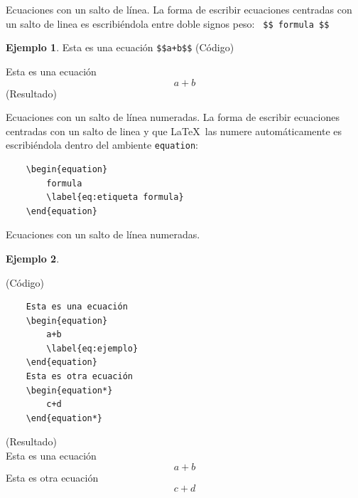 \documentclass[dvipsnames,xcolor, handout]{beamer}
\theoremstyle{plain}
\theoremstyle{definition}
\newtheorem{ejemplo}{Ejemplo}
\begin{document}
\begin{frame}[fragile]{Ecuaciones con un salto de línea.}
    La forma de escribir ecuaciones centradas con un salto de linea es escribiéndola entre doble signos peso: \verb! $$ formula $$! 
    
    \begin{ejemplo}
    Esta es una ecuación \verb!$$a+b$$! (Código)
    
    Esta es una ecuación $$a+b$$ (Resultado)
    
    \end{ejemplo}
\end{frame}

\begin{frame}[fragile]{Ecuaciones con un salto de línea numeradas.}
    La forma de escribir ecuaciones centradas con un salto de linea y que \LaTeX\ las numere automáticamente es escribiéndola dentro del ambiente \verb!equation!:
    \begin{verbatim}
    \begin{equation}
        formula
        \label{eq:etiqueta formula}
    \end{equation}  
    \end{verbatim}
    
\end{frame}

\begin{frame}[fragile]{Ecuaciones con un salto de línea numeradas.}

    \begin{ejemplo}
    \begin{multicols}{2}
    \setlength{\columnseprule}{0.8pt} 
    (Código) 
    \begin{verbatim}
    Esta es una ecuación
    \begin{equation}
        a+b
        \label{eq:ejemplo}
    \end{equation} 
    Esta es otra ecuación
    \begin{equation*}
        c+d
    \end{equation*} 
    \end{verbatim}
    \columnbreak
    
     (Resultado) \\
     Esta es una ecuación 
     \begin{equation}
        a+b
        \label{eq:ejemplo}
    \end{equation}  
    \vspace{0.5cm} Esta es otra ecuación
    \vspace*{-0.4cm}\begin{equation*}
        c+d
    \end{equation*} 
    \end{multicols}
    \end{ejemplo}
    
\end{frame}
\end{document}

